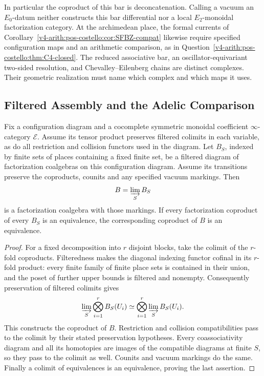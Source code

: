 In particular the coproduct of this bar is deconcatenation.
Calling a vacuum an \(E_0\)-datum neither constructs this bar
differential nor a local \(E_2\)-monoidal factorization category.
At the archimedean place, the formal currents of
Corollary~\ref{v4-arith:pos-costello:cor:SFBZ-compat} likewise require
specified configuration maps and an arithmetic comparison, as in
Question~\ref{v4-arith:pos-costello:thm:C4-closed}. The reduced
associative bar, an oscillator-equivariant two-sided resolution,
and Chevalley--Eilenberg chains are distinct complexes. Their
geometric realization must name which complex and which maps it uses.

\subsection{Filtered Assembly and the Adelic Comparison}

\begin{theorem}
\label{v4-arith:pos-costello:thm:C1-closed}
Fix a configuration diagram and a cocomplete symmetric monoidal
coefficient \(\infty\)-category \(\mathcal E\). Assume its tensor product
preserves filtered colimits in each variable, as do all restriction
and collision functors used in the diagram. Let \(B_S\), indexed
by finite sets of places containing a fixed finite set, be a
filtered diagram of factorization coalgebras on this configuration
diagram. Assume its transitions preserve the coproducts, counits
and any specified vacuum markings. Then
\[
                     B=\varinjlim_S B_S
\]
is a factorization coalgebra with those markings. If every
factorization coproduct of every \(B_S\) is an equivalence,
the corresponding coproduct of \(B\) is an equivalence.
\end{theorem}

\begin{proof}
For a fixed decomposition into \(r\) disjoint blocks, take the
colimit of the \(r\)-fold coproducts. Filteredness makes the
diagonal indexing functor cofinal in its \(r\)-fold product:
every finite family of finite place sets is contained in their
union, and the poset of further upper bounds is filtered and
nonempty. Consequently preservation of filtered colimits gives
\[
 \varinjlim_S\bigotimes_{i=1}^r B_S(U_i)
       \simeq\bigotimes_{i=1}^r\varinjlim_S B_S(U_i).
\]
This constructs the coproduct of \(B\). Restriction and collision
compatibilities pass to the colimit by their stated preservation
hypotheses. Every coassociativity diagram and all its homotopies
are images of the compatible diagrams at finite \(S\), so they
pass to the colimit as well. Counits and vacuum markings do the
same. Finally a colimit of equivalences is an equivalence, proving
the last assertion.
\end{proof}

